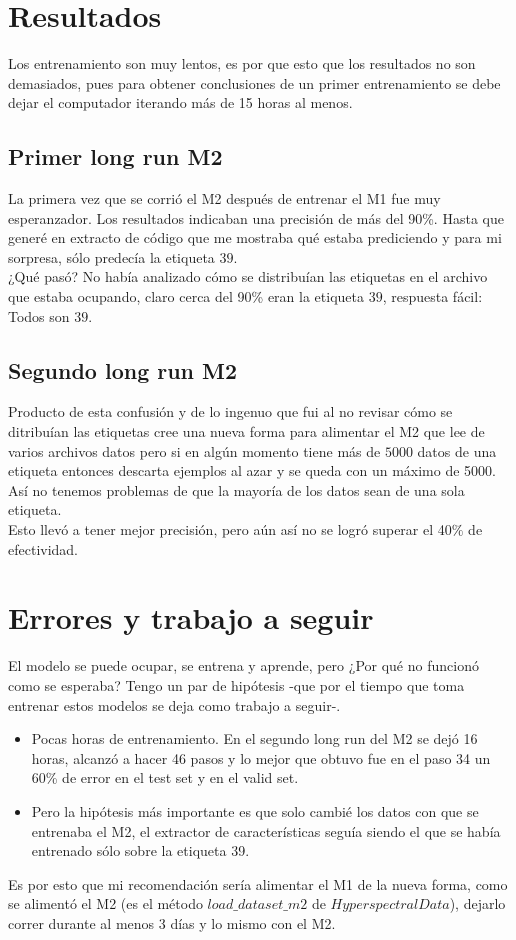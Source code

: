 \documentclass[letterpaper,11pt]{article} %
\begin{document}
\section{Resultados}

	Los entrenamiento son muy lentos, es por que esto que los resultados no son demasiados, pues para obtener conclusiones de un primer entrenamiento se debe dejar el computador iterando más de 15 horas al menos.

	\subsection{Primer long run M2}
	
	La primera vez que se corrió el M2 después de entrenar el M1 fue muy esperanzador. Los resultados indicaban una precisión de más del 90\%. Hasta que generé en extracto de código que me mostraba qué estaba prediciendo y para mi sorpresa, sólo predecía la etiqueta $39$.\\
	¿Qué pasó? No había analizado cómo se distribuían las etiquetas en el archivo que estaba ocupando, claro cerca del 90\% eran la etiqueta $39$, respuesta fácil: Todos son $39$.
	
	\subsection{Segundo long run M2}
	
	Producto de esta confusión y de lo ingenuo que fui al no revisar cómo se ditribuían las etiquetas cree una nueva forma para alimentar el M2 que lee de varios archivos datos pero si en algún momento tiene más de $5000$ datos de una etiqueta entonces descarta ejemplos al azar y se queda con un máximo de 5000. Así no tenemos problemas de que la mayoría de los datos sean de una sola etiqueta.\\
	
	Esto llevó a tener mejor precisión, pero aún así no se logró superar el 40$\%$ de efectividad.
	
\section{Errores y trabajo a seguir}

El modelo se puede ocupar, se entrena y aprende, pero ¿Por qué no funcionó como se esperaba? Tengo un par de hipótesis -que por el tiempo que toma entrenar estos modelos se deja como trabajo a seguir-.

\begin{itemize}
	\item Pocas horas de entrenamiento. En el segundo long run del M2 se dejó 16 horas, alcanzó a hacer 46 pasos y lo mejor que obtuvo fue en el paso 34 un 60\% de error en el test set y en el valid set.
	\item Pero la hipótesis más importante es que solo cambié los datos con que se entrenaba el M2, el extractor de características seguía siendo el que se había entrenado sólo sobre la etiqueta 39.
\end{itemize}

Es por esto que mi recomendación sería alimentar el M1 de la nueva forma, como se alimentó el M2 (es el método $load\_dataset\_m2$ de $HyperspectralData$), dejarlo correr durante al menos 3 días y lo mismo con el M2.


\end{document}
